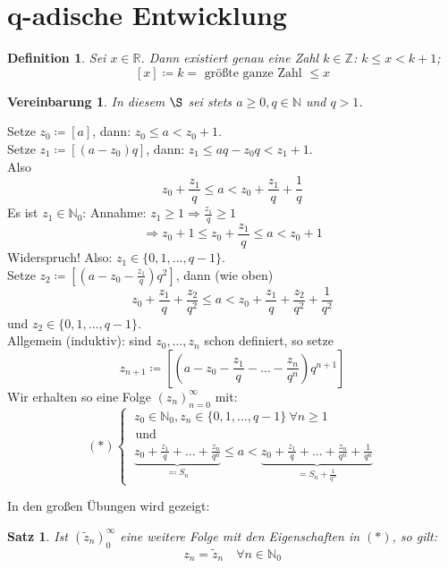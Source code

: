 \documentclass[14pt,titlepage,ngerman,a4paper,headsepline,DIV15,halfparskip*]{scrartcl}
\newcommand{\N}{\mathbb{N}}
\newcommand{\R}{\mathbb{R}}
\newcommand{\Z}{\mathbb{Z}}
\theoremstyle{named}
\theoremstyle{dotless}
\newtheorem{satz}[namedtheorem]{Satz}
\newtheorem*{definition}{Definition}
\newtheorem*{vereinbarung}{Vereinbarung}
\begin{document}
\section{q-adische Entwicklung}

\begin{definition}
	Sei $x \in \R$. Dann existiert genau eine Zahl $k \in \Z$: $k \leq x < k + 1$; 
		$$ [x] \coloneqq k = \text{ grö{\ss}te ganze Zahl } \leq x $$
\end{definition}


\begin{vereinbarung}
	In diesem $\S$ sei stets $a \geq 0, q \in \N$ und $q > 1$.
\end{vereinbarung}


Setze $z_{0} \coloneqq [a]$, dann: $z_{0} \leq a < z_{0} + 1$. \\
Setze $z_{1} \coloneqq [(a-z_{0})q]$, dann: $z_{1} \leq aq - z_{0}q < z_{1} + 1$. \\
Also
	$$ z_{0} + \frac{z_{1}}{q} \leq a < z_{0} + \frac{z_{1}}{q} + \frac{1}{q} $$
Es ist $z_{1} \in \N_{0}$: Annahme: $z_{1} \geq 1 \Rightarrow \frac{z_{1}}{q} \geq 1$
	$$ \Rightarrow z_{0} + 1 \leq z_{0} + \frac{z_{1}}{q} \leq a < z_{0} +1 $$
Widerspruch! Also: $z_{1} \in \{ 0, 1, \dotsc, q - 1 \}$. \\
Setze  $z_{2} \coloneqq [(a-z_{0}-\frac{z_{1}}{q})q^{2}]$, dann (wie oben)
	$$ z_{0} + \frac{z_{1}}{q} + \frac{z_{2}}{q^{2}} \leq a < z_{0} + \frac{z_{1}}{q} + \frac{z_{2}}{q^{2}} + \frac{1}{q^{2}} $$
und $z_{2} \in \{ 0, 1, \dotsc, q - 1 \}$. \\
Allgemein (induktiv): sind $z_{0}, \dotsc, z_{n}$ schon definiert, so setze
	$$ z_{n+1} \coloneqq [(a - z_{0} - \frac{z_{1}}{q} - \dotsc - \frac{z_{n}}{q^{n}}) q^{n+1}] $$
Wir erhalten so eine Folge $(z_{n})_{n=0}^{\infty}$ mit:
	$$ (*) \begin{cases} ~ z_{0} \in \N_{0}, z_{n} \in \{ 0, 1, \dotsc, q - 1 \} ~\forall n \geq 1 \\ \text{ und} \\ ~\underbrace{z_{0} + \frac{z_{1}}{q} + \dotsc + \frac{z_{n}}{q^{n}}}_{\eqqcolon S_{n}} \leq a < \underbrace{ z_{0} + \frac{z_{1}}{q} + \dotsc + \frac{z_{n}}{q^{n}} + \frac{1}{q^{n}}}_{= S_{n} + \frac{1}{q^{n}}} \end{cases} $$


In den gro{\ss}en Übungen wird gezeigt:

\begin{satz} \label{5.1:satz}
	Ist $(\tilde{z}_{n})_{0}^{\infty}$ eine weitere Folge mit den Eigenschaften in $(*)$, so gilt: 
	$$ z_{n} = \tilde{z}_{n} \quad \forall n \in \N_{0} $$
\end{satz}
\end{document}

